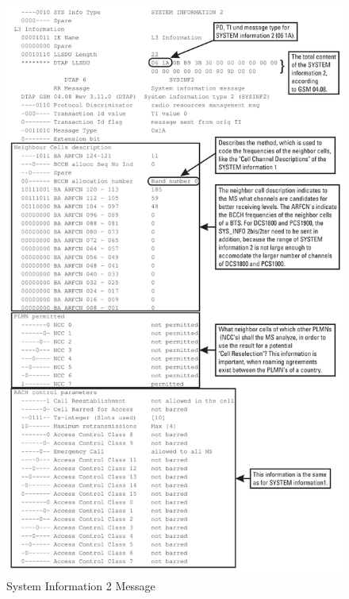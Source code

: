 \begin{figure}
\centering
\includegraphics[width=.9\textwidth]{../Images/sysinfo2}
\caption{System Information 2 Message}
\end{figure}
